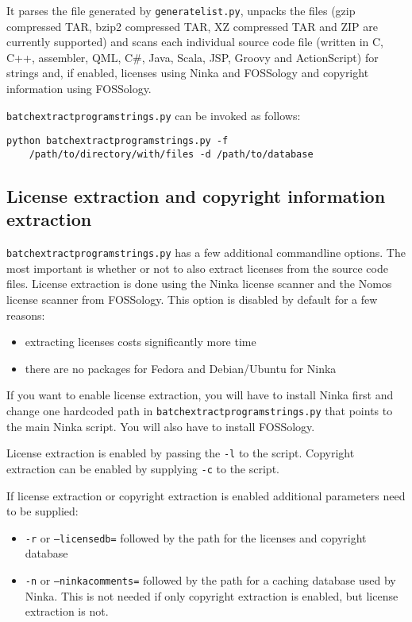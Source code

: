\documentclass[10pt]{article}
\begin{document}
It parses the file generated by \texttt{generatelist.py}, unpacks the files
(gzip compressed TAR, bzip2 compressed TAR, XZ compressed TAR and ZIP are
currently supported) and scans each individual source code file (written in C,
C++, assembler, QML, C\#, Java, Scala, JSP, Groovy and ActionScript) for strings
and, if enabled, licenses using Ninka and FOSSology and copyright information
using FOSSology.

\texttt{batchextractprogramstrings.py} can be invoked as follows:

\begin{verbatim}
python batchextractprogramstrings.py -f
    /path/to/directory/with/files -d /path/to/database
\end{verbatim}

\subsection{License extraction and copyright information extraction}

\texttt{batchextractprogramstrings.py} has a few additional commandline
options. The most important is whether or not to also extract licenses from
the source code files.  License extraction is done using the Ninka license
scanner and the Nomos license scanner from FOSSology. This option is disabled
by default for a few reasons:

\begin{itemize}
\item extracting licenses costs significantly more time
\item there are no packages for Fedora and Debian/Ubuntu for Ninka
\end{itemize}

If you want to enable license extraction, you will have to install Ninka first
and change one hardcoded path in \texttt{batchextractprogramstrings.py} that
points to the main Ninka script. You will also have to install FOSSology.

License extraction is enabled by passing the \texttt{-l} to the script.
Copyright extraction can be enabled by supplying \texttt{-c} to the script.

If license extraction or copyright extraction is enabled additional parameters
need to be supplied:

\begin{itemize}
\item \texttt{-r} or \texttt{--licensedb=} followed by the path for the
licenses and copyright database
\item \texttt{-n} or \texttt{--ninkacomments=} followed by the path for a
caching database used by Ninka. This is not needed if only copyright extraction
is enabled, but license extraction is not.
\end{itemize}
\end{document}
